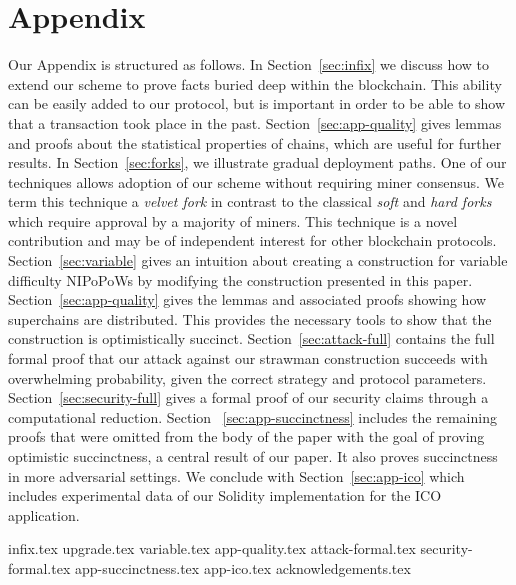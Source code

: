 \appendix
\section*{Appendix}

Our Appendix is structured as follows.
In Section~\ref{sec:infix} we discuss how to extend our scheme to prove facts
buried deep within the blockchain. This ability can be easily added to our
protocol, but is important in order to be able to show that a transaction took
place in the past.
Section~\ref{sec:app-quality} gives lemmas and proofs about the statistical
properties of chains, which are useful for further results.
In Section~\ref{sec:forks}, we illustrate
gradual deployment paths. One of our techniques allows adoption of our scheme
without requiring miner consensus. We term this technique a \emph{velvet fork}
in contrast to the classical \emph{soft} and \emph{hard forks} which require
approval by a majority of miners. This technique is a novel contribution and may
be of independent interest for other blockchain protocols.
Section~\ref{sec:variable} gives an intuition about creating a construction for
variable difficulty NIPoPoWs by modifying the construction presented in this
paper.
Section~\ref{sec:app-quality} gives the lemmas and associated proofs showing how
superchains are distributed. This provides the necessary tools to show that the
construction is optimistically succinct.
Section~\ref{sec:attack-full} contains
the full formal proof that our attack against our strawman construction succeeds with overwhelming probability, given the correct
strategy and protocol parameters. Section~\ref{sec:security-full} gives a formal
proof of our security claims through a computational reduction. Section~
\ref{sec:app-succinctness} includes the remaining proofs that were omitted from
the body of the paper with the goal of proving optimistic succinctness, a
central result of our paper. It also proves succinctness in more adversarial
settings. We conclude with
Section~\ref{sec:app-ico} which includes experimental data of our Solidity
implementation for the ICO application.

{infix.tex}
{upgrade.tex}
{variable.tex}
{app-quality.tex}
{attack-formal.tex}
{security-formal.tex}
{app-succinctness.tex}
{app-ico.tex}
{acknowledgements.tex}
